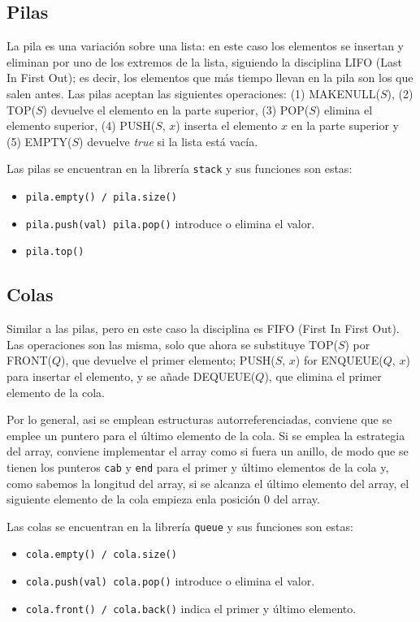 \documentclass[a4paper]{article}
\begin{document}
	\subsection{Pilas}
	La pila es una variación sobre una lista: en este caso los elementos se insertan y eliminan por uno de los extremos de la lista, siguiendo la disciplina LIFO (Last In First Out); es decir, los elementos que más tiempo llevan en la pila son los que salen antes. Las pilas aceptan las siguientes operaciones: (1) MAKENULL($S$), (2) TOP($S$) devuelve el elemento en la parte superior, (3) POP($S$) elimina el elemento superior, (4) PUSH($S$, $x$) inserta el elemento $x$ en la parte superior y (5) EMPTY($S$) devuelve \textit{true} si la lista está vacía.
	
	Las pilas se encuentran en la librería \verb|stack| y sus funciones son estas:
	
	\begin{itemize}
		\item \verb|pila.empty() / pila.size()|
		\item \verb|pila.push(val) pila.pop()| introduce o elimina el valor.
		\item \verb|pila.top()|
	\end{itemize}
	
	\subsection{Colas}
	Similar a las pilas, pero en este caso la disciplina es FIFO (First In First Out). Las operaciones son las misma, solo que ahora se substituye TOP($S$) por FRONT($Q$), que devuelve el primer elemento; PUSH($S$, $x$) for ENQUEUE($Q$, $x$) para insertar el elemento, y se añade DEQUEUE($Q$), que elimina el primer elemento de la cola. 
	
	Por lo general, asi se emplean estructuras autorreferenciadas, conviene que se emplee un puntero para el último elemento de la cola. Si se emplea la estrategia del array, conviene implementar el array como si fuera un anillo, de modo que se tienen los punteros \verb|cab| y \verb|end| para el primer y último elementos de la cola y, como sabemos la longitud del array, si se alcanza el último elemento del array, el siguiente elemento de la cola empieza enla posición 0 del array. 	
	
	Las colas se encuentran en la librería \verb|queue| y sus funciones son estas:
	
	\begin{itemize}
		\item \verb|cola.empty() / cola.size()|
		\item \verb|cola.push(val) cola.pop()| introduce o elimina el valor.
		\item \verb|cola.front() / cola.back()| indica el primer y último elemento.
	\end{itemize}
	
\end{document}
